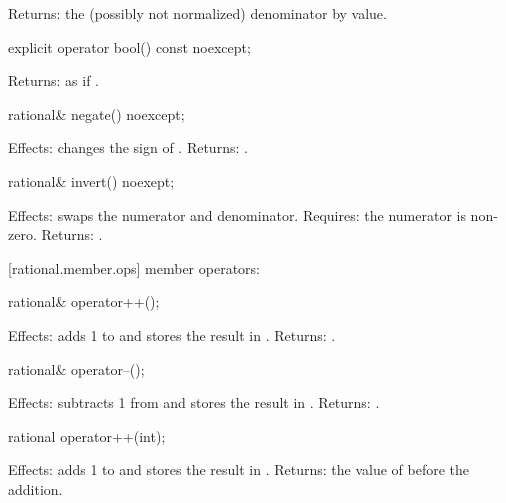 \begin{itemdescr}
Returns: the (possibly not normalized) denominator by value.
\end{itemdescr}

\begin{itemdecl}
explicit operator bool() const noexcept;
\end{itemdecl}

\begin{itemdescr}
Returns: as if .
\end{itemdescr}

\begin{itemdecl}
rational& negate() noexcept;
\end{itemdecl}

\begin{itemdescr}
Effects: changes the sign of .
Returns: .
\end{itemdescr}

\begin{itemdecl}
rational& invert() noexept;
\end{itemdecl}

\begin{itemdescr}
Effects: swaps the numerator and denominator.
Requires: the numerator is non-zero.
Returns: .
\end{itemdescr}

[rational.member.ops]{ member operators:}

\begin{itemdecl}
rational& operator++();
\end{itemdecl}

\begin{itemdescr}
Effects: adds 1 to  and stores the result in .
Returns: .
\end{itemdescr}

\begin{itemdecl}
rational& operator--();
\end{itemdecl}

\begin{itemdescr}
Effects: subtracts 1 from  and stores the result in .
Returns: .
\end{itemdescr}

\begin{itemdecl}
rational operator++(int);
\end{itemdecl}

\begin{itemdescr}
Effects: adds 1 to  and stores the result in .
Returns: the value of  before the addition.
\end{itemdescr}

